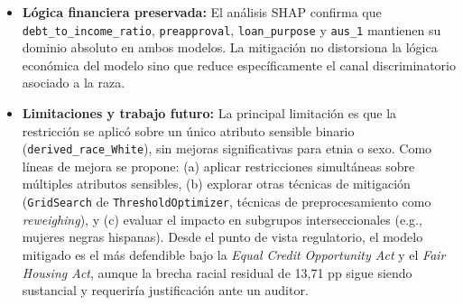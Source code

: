 \documentclass[11pt,a4paper]{article}
\begin{document}
\begin{itemize}
    \item \textbf{Lógica financiera preservada:} El análisis SHAP confirma que
    \texttt{debt\_to\_income\_ratio}, \texttt{preapproval}, \texttt{loan\_purpose} y \texttt{aus\_1}
    mantienen su dominio absoluto en ambos modelos. La mitigación no distorsiona la lógica
    económica del modelo sino que reduce específicamente el canal discriminatorio asociado a
    la raza.

    \item \textbf{Limitaciones y trabajo futuro:} La principal limitación es que la restricción
    se aplicó sobre un único atributo sensible binario (\texttt{derived\_race\_White}), sin
    mejoras significativas para etnia o sexo. Como líneas de mejora se propone: (a) aplicar
    restricciones simultáneas sobre múltiples atributos sensibles, (b) explorar otras técnicas
    de mitigación (\texttt{GridSearch} de \texttt{ThresholdOptimizer}, técnicas de
    preprocesamiento como \textit{reweighing}), y (c) evaluar el impacto en subgrupos
    interseccionales (e.g., mujeres negras hispanas). Desde el punto de vista regulatorio, el
    modelo mitigado es el más defendible bajo la \textit{Equal Credit Opportunity Act} y el
    \textit{Fair Housing Act}, aunque la brecha racial residual de 13{,}71 pp sigue siendo
    sustancial y requeriría justificación ante un auditor.

\end{itemize}
\end{document}
